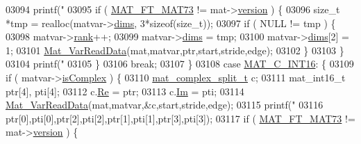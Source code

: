 \begin{DoxyCode}
{{{{{{{{{{{{{{{{{{{{{{{{{{{{{{{{{{{{{{{{{{03094                         printf(\textcolor{stringliteral}{"%
03095                         \textcolor{keywordflow}{if} ( \hyperlink{group___m_a_t_ggad03442b8378999189d510e3745c702b7a765c5d1d5038947646260dc82483517e}{MAT\_FT\_MAT73} != mat->\hyperlink{struct__mat__t_a729c2bc0afc97485057a5af425635b1a}{version} ) \{
03096                             \textcolor{keywordtype}{size\_t} *tmp = realloc(matvar->\hyperlink{group___m_a_t_a8e01234e1c862ce3472bb37f5a09b92c}{dims}, 3*\textcolor{keyword}{sizeof}(\textcolor{keywordtype}{size\_t}));
03097                             \textcolor{keywordflow}{if} ( NULL != tmp ) \{
03098                                 matvar->\hyperlink{group___m_a_t_a84ba70c96ded13cc555fa75b768d9921}{rank}++;
03099                                 matvar->\hyperlink{group___m_a_t_a8e01234e1c862ce3472bb37f5a09b92c}{dims} = tmp;
03100                                 matvar->\hyperlink{group___m_a_t_a8e01234e1c862ce3472bb37f5a09b92c}{dims}[2] = 1;
03101                                 \hyperlink{group___m_a_t_ga1845000f4fc6252ec5ff11c4b9f0759f}{Mat\_VarReadData}(mat,matvar,ptr,start,stride,edge);
03102                             \}
03103                         \}
03104                         printf(\textcolor{stringliteral}{"%
03105                     \}
03106                     \textcolor{keywordflow}{break};
03107                 \}
03108                 \textcolor{keywordflow}{case} \hyperlink{group___m_a_t_ggad4d60ae7b709fc81bfd744fb4c857c40a40370e9de516c5036a67a5865c071006}{MAT\_C\_INT16}: \{
03109                     \textcolor{keywordflow}{if} ( matvar->\hyperlink{group___m_a_t_aeb03b3a69f108dc05470b00443a43739}{isComplex} ) \{
03110                         \hyperlink{group___m_a_t_structmat__complex__split__t}{mat\_complex\_split\_t} c;
03111                         mat\_int16\_t ptr[4], pti[4];
03112                         c.\hyperlink{group___m_a_t_a484a93607508adac2bce53a0252e0325}{Re} = ptr;
03113                         c.\hyperlink{group___m_a_t_a7182d10b0d3598415887376065440946}{Im} = pti;
03114                         \hyperlink{group___m_a_t_ga1845000f4fc6252ec5ff11c4b9f0759f}{Mat\_VarReadData}(mat,matvar,&c,start,stride,edge);
03115                         printf(\textcolor{stringliteral}{"%
03116                             ptr[0],pti[0],ptr[2],pti[2],ptr[1],pti[1],ptr[3],pti[3]);
03117                         \textcolor{keywordflow}{if} ( \hyperlink{group___m_a_t_ggad03442b8378999189d510e3745c702b7a765c5d1d5038947646260dc82483517e}{MAT\_FT\_MAT73} != mat->\hyperlink{struct__mat__t_a729c2bc0afc97485057a5af425635b1a}{version} ) \{
}}}}}}}}}}}}}}}}}}}}}}}}}}}}}}}}}}}}}}}}}}}}}
\end{DoxyCode}
